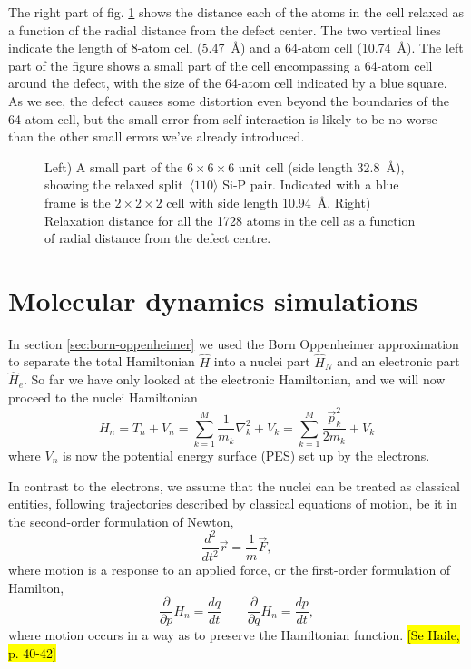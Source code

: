 \documentclass[11pt,bibliography=totoc,index=totoc]{scrbook}   %
\newcommand{\comment}[1]{\hl{#1}}
\begin{document}
The right part of fig. \ref{fig:tests/cellsize} shows the distance each of the atoms in the cell relaxed as a function of the radial distance from the defect center. The two vertical lines indicate the length of 8-atom cell (5.47~Å) and a 64-atom cell (10.74~Å). 
The left part of the figure shows a small part of the cell encompassing a 64-atom cell around the defect, with the size of the 64-atom cell indicated by a blue square.
As we see, the defect causes some distortion even beyond the boundaries of the 64-atom cell, but the small error from self-interaction is likely to be no worse than the other small errors we've already introduced.

\begin{figure}[htp]
  \centering
  \caption{Left) A small part of the $6\times 6\times 6$ unit cell (side length 32.8~Å), showing the 
  relaxed split~$\langle 110 \rangle$ Si-P pair.
  Indicated with a blue frame is the $2\times 2\times 2$ cell with side length 10.94~Å.
  Right) Relaxation distance for all the 1728 atoms in the cell as a function of radial distance from the defect centre.}
  \label{fig:tests/cellsize}
\end{figure}


\chapter{Molecular dynamics simulations}\label{cha:molecular-dynamics}

In section \ref{sec:born-oppenheimer} we used the Born Oppenheimer approximation to separate the total Hamiltonian $\hat{H}$ into a nuclei part $\hat{H}_N$ and an electronic part $\hat{H}_e$. 
So far we have only looked at the electronic Hamiltonian, and we will now proceed to the nuclei Hamiltonian
\begin{equation}
  H_n = T_n + V_n = \sum_{k=1}^M \frac{1}{m_k}\nabla_k^2 + V_k = \sum_{k=1}^M \frac{\vec{p}_k^2}{2m_k} + V_k
  \label{eq:nucleiHamiltonian}
\end{equation}
where $V_n$ is now the potential energy surface (PES) set up by the electrons.

In contrast to the electrons, we assume that the nuclei can be treated as classical entities, following trajectories described by 
classical equations of motion, be it in the
second-order formulation of Newton,
\begin{equation}
  \frac{d^2}{d t^2} \vec{r} = \frac{1}{m}\vec{F},
\end{equation}
where motion is a response to an applied force,
or the first-order formulation of Hamilton,
\begin{equation}
  \frac{\partial}{\partial p} H_n = \frac{dq}{dt} \qquad
  \frac{\partial}{\partial q} H_n = \frac{dp}{dt},
\end{equation}
where motion occurs in a way as to preserve the Hamiltonian function.
\comment{[Se Haile, p. 40-42]}
\end{document}
